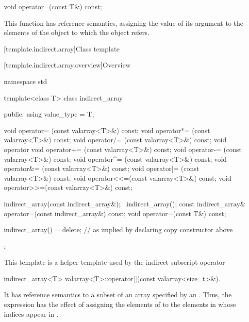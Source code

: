 %
\begin{itemdecl}
void operator=(const T&) const;
\end{itemdecl}

\begin{itemdescr}
\pnum
This function has reference semantics, assigning the value of its
argument to the elements of the
object to which the
object refers.
\end{itemdescr}

[template.indirect.array]{Class template }

[template.indirect.array.overview]{Overview}

%
%
\begin{codeblock}
namespace std {
  template<class T> class indirect_array {
  public:
    using value_type = T;

    void operator=  (const valarray<T>&) const;
    void operator*= (const valarray<T>&) const;
    void operator/= (const valarray<T>&) const;
    void operator%
    void operator+= (const valarray<T>&) const;
    void operator-= (const valarray<T>&) const;
    void operator^= (const valarray<T>&) const;
    void operator&= (const valarray<T>&) const;
    void operator|= (const valarray<T>&) const;
    void operator<<=(const valarray<T>&) const;
    void operator>>=(const valarray<T>&) const;

    indirect_array(const indirect_array&);
    ~indirect_array();
    const indirect_array& operator=(const indirect_array&) const;
    void operator=(const T&) const;

    indirect_array() = delete;  // as implied by declaring copy constructor above
  };
}
\end{codeblock}

\pnum
This template is a helper template used by the indirect subscript operator

%
\begin{itemdecl}
indirect_array<T> valarray<T>::operator[](const valarray<size_t>&).
\end{itemdecl}

\pnum
It has reference semantics to a subset of an array specified by an
.
Thus, the expression
has the effect of assigning the elements of
to the elements in
whose indices appear in
.

